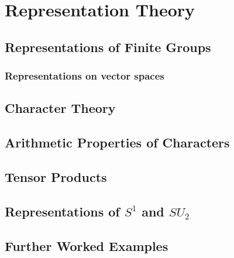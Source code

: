 \documentclass[main.tex]{subfiles}
\begin{document}
	\chapter{Representation Theory}
		\section{Representations of Finite Groups}
			\subsection{Representations on vector spaces}
		
		\section{Character Theory}
		
		\section{Arithmetic Properties of Characters}
		
		\section{Tensor Products}
		
		\section{Representations of $S^1$ and $SU_2$}
		
		\section{Further Worked Examples}
				
\end{document}
